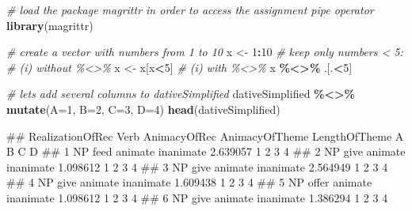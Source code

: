 \documentclass[
]{book}
\newenvironment{Shaded}{\begin{snugshade}}{\end{snugshade}}
\newcommand{\AttributeTok}[1]{\textcolor[rgb]{0.13,0.29,0.53}{#1}}
\newcommand{\CommentTok}[1]{\textcolor[rgb]{0.56,0.35,0.01}{\textit{#1}}}
\newcommand{\DecValTok}[1]{\textcolor[rgb]{0.00,0.00,0.81}{#1}}
\newcommand{\FunctionTok}[1]{\textcolor[rgb]{0.13,0.29,0.53}{\textbf{#1}}}
\newcommand{\NormalTok}[1]{#1}
\newcommand{\OtherTok}[1]{\textcolor[rgb]{0.56,0.35,0.01}{#1}}
\newcommand{\SpecialCharTok}[1]{\textcolor[rgb]{0.81,0.36,0.00}{\textbf{#1}}}
\begin{document}
\begin{Shaded}
\begin{Highlighting}[]
\CommentTok{\# load the package magrittr in order to access the assignment pipe operator}
\FunctionTok{library}\NormalTok{(magrittr)}

\CommentTok{\# create a vector with numbers from 1 to 10}
\NormalTok{x }\OtherTok{\textless{}{-}} \DecValTok{1}\SpecialCharTok{:}\DecValTok{10}
\CommentTok{\# keep only numbers \textless{} 5:}
\CommentTok{\#   (i) without \%\textless{}\textgreater{}\%}
\NormalTok{x }\OtherTok{\textless{}{-}}\NormalTok{ x[x}\SpecialCharTok{\textless{}}\DecValTok{5}\NormalTok{]}
\CommentTok{\#   (i) with \%\textless{}\textgreater{}\%}
\NormalTok{x }\SpecialCharTok{\%\textless{}\textgreater{}\%}\NormalTok{ .[.}\SpecialCharTok{\textless{}}\DecValTok{5}\NormalTok{]}
\end{Highlighting}
\end{Shaded}

\begin{Shaded}
\begin{Highlighting}[]
\CommentTok{\# lets add several columns to \textquotesingle{}dativeSimplified\textquotesingle{}}
\NormalTok{dativeSimplified }\SpecialCharTok{\%\textless{}\textgreater{}\%} \FunctionTok{mutate}\NormalTok{(}\AttributeTok{A=}\DecValTok{1}\NormalTok{, }\AttributeTok{B=}\DecValTok{2}\NormalTok{, }\AttributeTok{C=}\DecValTok{3}\NormalTok{, }\AttributeTok{D=}\DecValTok{4}\NormalTok{)}
\FunctionTok{head}\NormalTok{(dativeSimplified)}
\end{Highlighting}
\end{Shaded}

\begin{Shaded}
\begin{Highlighting}[]
\NormalTok{\#\#   RealizationOfRec  Verb AnimacyOfRec AnimacyOfTheme LengthOfTheme A B C D}
\NormalTok{\#\# 1               NP  feed      animate      inanimate      2.639057 1 2 3 4}
\NormalTok{\#\# 2               NP  give      animate      inanimate      1.098612 1 2 3 4}
\NormalTok{\#\# 3               NP  give      animate      inanimate      2.564949 1 2 3 4}
\NormalTok{\#\# 4               NP  give      animate      inanimate      1.609438 1 2 3 4}
\NormalTok{\#\# 5               NP offer      animate      inanimate      1.098612 1 2 3 4}
\NormalTok{\#\# 6               NP  give      animate      inanimate      1.386294 1 2 3 4}
\end{Highlighting}
\end{Shaded}
\end{document}
